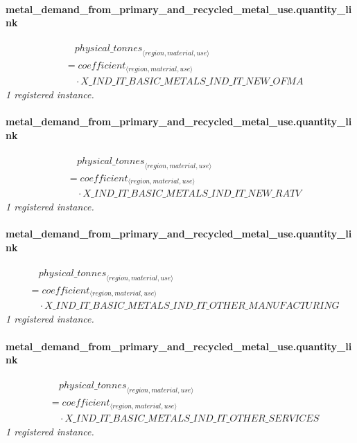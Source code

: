 \documentclass[11pt]{article}
\begin{document}
\paragraph{metal\_demand\_from\_primary\_and\_recycled\_metal\_use.quantity\_link}
\begin{align*}
&\quad {physical\_tonnes}_{\langle region, material, use\rangle}\\
&= coefficient_{\langle region, material, use\rangle}\\
&\quad {}\cdot X\_IND\_IT\_BASIC\_METALS\_IND\_IT\_NEW\_OFMA
\end{align*}
\noindent\emph{1 registered instance.}\par
\paragraph{metal\_demand\_from\_primary\_and\_recycled\_metal\_use.quantity\_link}
\begin{align*}
&\quad {physical\_tonnes}_{\langle region, material, use\rangle}\\
&= coefficient_{\langle region, material, use\rangle}\\
&\quad {}\cdot X\_IND\_IT\_BASIC\_METALS\_IND\_IT\_NEW\_RATV
\end{align*}
\noindent\emph{1 registered instance.}\par
\paragraph{metal\_demand\_from\_primary\_and\_recycled\_metal\_use.quantity\_link}
\begin{align*}
&\quad {physical\_tonnes}_{\langle region, material, use\rangle}\\
&= coefficient_{\langle region, material, use\rangle}\\
&\quad {}\cdot X\_IND\_IT\_BASIC\_METALS\_IND\_IT\_OTHER\_MANUFACTURING
\end{align*}
\noindent\emph{1 registered instance.}\par
\paragraph{metal\_demand\_from\_primary\_and\_recycled\_metal\_use.quantity\_link}
\begin{align*}
&\quad {physical\_tonnes}_{\langle region, material, use\rangle}\\
&= coefficient_{\langle region, material, use\rangle}\\
&\quad {}\cdot X\_IND\_IT\_BASIC\_METALS\_IND\_IT\_OTHER\_SERVICES
\end{align*}
\noindent\emph{1 registered instance.}\par
\end{document}
